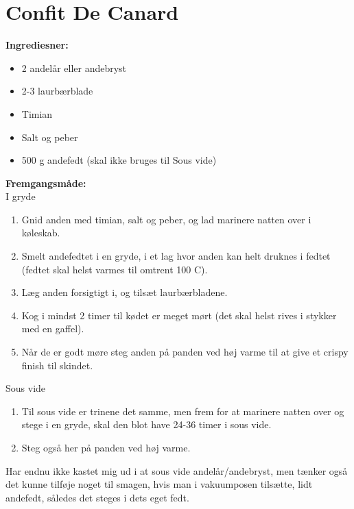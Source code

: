 \documentclass{book}
\begin{document}
\newpage \section{Confit De Canard}
\begin{minipage}[t]{0.5\textwidth}
\textbf{Ingrediesner:} 
\begin{itemize}
    \item 2 andelår eller andebryst
    \item 2-3 laurbærblade
    \item Timian
    \item Salt og peber
    \item 500 g andefedt (skal ikke bruges til Sous vide)
\end{itemize}
\end{minipage}
\begin{minipage}[t]{0.5\textwidth}
\textbf{Fremgangsmåde:}
\\ I gryde 
\begin{enumerate}
    \item Gnid anden med timian, salt og peber, og lad marinere natten over i køleskab.
    \item Smelt andefedtet i en gryde, i et lag hvor anden kan helt druknes i fedtet (fedtet skal helst varmes til omtrent 100 \degree C).
    \item Læg anden forsigtigt i, og tilsæt laurbærbladene. 
    \item Kog i mindst 2 timer til kødet er meget mørt (det skal helst rives i stykker med en gaffel).
    \item Når de er godt møre steg anden på panden ved høj varme til at give et crispy finish til skindet.
\end{enumerate}
Sous vide
\begin{enumerate}
    \item Til sous vide er trinene det samme, men frem for at marinere natten over og stege i en gryde, skal den blot have 24-36 timer i sous vide.
    \item Steg også her på panden ved høj varme. 
\end{enumerate}
\end{minipage}
Har endnu ikke kastet mig ud i at sous vide andelår/andebryst, men tænker også det kunne tilføje noget til smagen, hvis man i vakuumposen tilsætte, lidt andefedt, således det steges i dets eget fedt.
\end{document}
